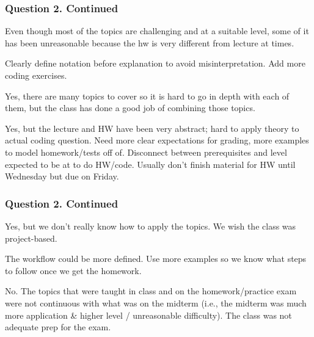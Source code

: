 \documentclass{beamer}
\begin{document}
\begin{frame}
  \frametitle{Question 2. Continued}
  
\begin{myitemize}
  \item Even though most of the topics are challenging and at a suitable level, some of it has been unreasonable because the hw is very different from lecture at times.
  \item Clearly define notation before explanation to avoid misinterpretation. Add more coding exercises.
  \item Yes, there are many topics to cover so it is hard to go in depth with each of them, but the class has done a good job of combining those topics.
  \item Yes, but the lecture and HW have been very abstract; hard to apply theory to actual coding question. Need more clear expectations for grading, more examples to model homework/tests off of. Disconnect between prerequisites and level expected to be at to do HW/code. Usually don't finish material for HW until Wednesday but due on Friday.
\end{myitemize}
\end{frame}

\begin{frame}
  \frametitle{Question 2. Continued}
  
\begin{myitemize}
  \item Yes, but we don't really know how to apply the topics. We wish the class was project-based.
  \item The workflow could be more defined. Use more examples so we know what steps to follow once we get the homework.
  \item No. The topics that were taught in class and on the homework/practice exam were not continuous with what was on the midterm (i.e., the midterm was much more application \& higher level / unreasonable difficulty). The class was not adequate prep for the exam.
\end{myitemize}

\end{frame}
\end{document}
